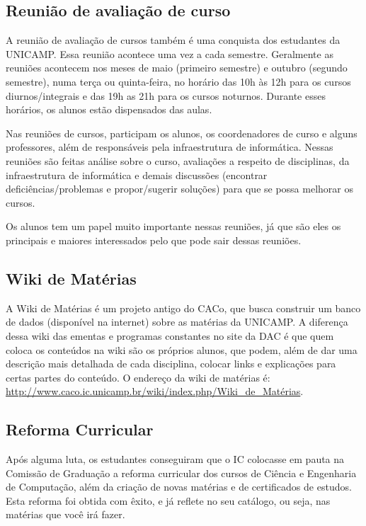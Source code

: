 \subsection{Reunião de avaliação de curso}
A reunião de avaliação de cursos também é uma conquista dos estudantes da
UNICAMP. Essa reunião acontece uma vez a cada semestre. Geralmente as reuniões
acontecem nos meses de maio (primeiro semestre) e outubro (segundo semestre),
numa terça ou quinta-feira, no horário das 10h às 12h para os cursos
diurnos/integrais e das 19h as 21h para os cursos noturnos. Durante esses
horários, os alunos estão dispensados das aulas.

Nas reuniões de cursos, participam os alunos, os coordenadores de curso e alguns
professores, além de responsáveis pela infraestrutura de informática. Nessas
reuniões são feitas análise sobre o curso, avaliações a respeito de disciplinas,
da infraestrutura de informática e demais discussões (encontrar
deficiências/problemas e propor/sugerir soluções) para que se possa melhorar os
cursos.

Os alunos tem um papel muito importante nessas reuniões, já que são eles os
principais e maiores interessados pelo que pode sair dessas reuniões.

\subsection{Wiki de Matérias}
A Wiki de Matérias é um projeto antigo do CACo, que busca construir um banco de
dados (disponível na internet) sobre as matérias da UNICAMP. A diferença dessa
wiki das ementas e programas constantes no site da DAC é que quem coloca os
conteúdos na wiki são os próprios alunos, que podem, além de dar uma descrição
mais detalhada de cada disciplina, colocar links e explicações para certas
partes do conteúdo. O endereço da wiki de matérias é:
\url{http://www.caco.ic.unicamp.br/wiki/index.php/Wiki_de_Matérias}.

\subsection{Reforma Curricular}
Após alguma luta, os estudantes conseguiram que o IC colocasse em pauta na
Comissão de Graduação a reforma curricular dos cursos de Ciência e Engenharia de
Computação, além da criação de novas matérias e de certificados de estudos. Esta
reforma foi obtida com êxito, e já reflete no seu catálogo, ou seja, nas
matérias que você irá fazer.

